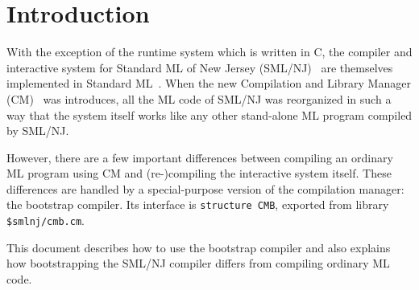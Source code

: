 
\section{Introduction}

With the exception of the runtime system which is written in C, the
compiler and interactive system for Standard ML of New Jersey
(SML/NJ)~\cite{appel91:sml} are themselves implemented in Standard
ML~\cite{milner97}.  When the new Compilation and Library Manager
(CM)~\cite{blume00:newcm} was introduces, all the ML code of SML/NJ
was reorganized in such a way that the system itself works like any
other stand-alone ML program compiled by SML/NJ.

However, there are a few important differences between compiling an
ordinary ML program using CM and (re-)compiling the interactive system
itself.  These differences are handled by a special-purpose version of
the compilation manager: the bootstrap compiler.  Its interface is
{\tt structure CMB}, exported from library {\tt \$smlnj/cmb.cm}.

This document describes how to use the bootstrap compiler and also
explains how bootstrapping the SML/NJ compiler differs from compiling
ordinary ML code.
